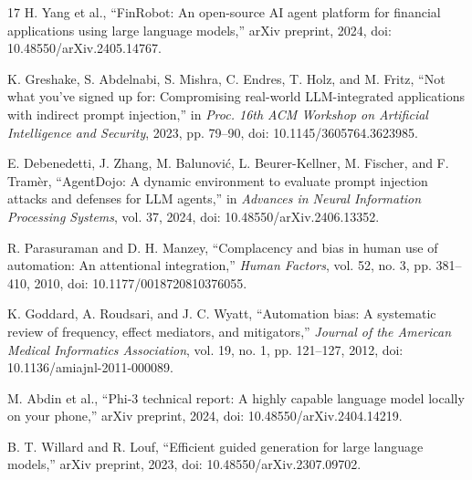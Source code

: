 \begin{thebibliography}{17}
 H. Yang et al., ``FinRobot: An open-source AI agent platform for financial applications using large language models,'' arXiv preprint, 2024, doi: 10.48550/arXiv.2405.14767.

 K. Greshake, S. Abdelnabi, S. Mishra, C. Endres, T. Holz, and M. Fritz, ``Not what you've signed up for: Compromising real-world LLM-integrated applications with indirect prompt injection,'' in \emph{Proc. 16th ACM Workshop on Artificial Intelligence and Security}, 2023, pp. 79--90, doi: 10.1145/3605764.3623985.

 E. Debenedetti, J. Zhang, M. Balunovi\'{c}, L. Beurer-Kellner, M. Fischer, and F. Tram\`{e}r, ``AgentDojo: A dynamic environment to evaluate prompt injection attacks and defenses for LLM agents,'' in \emph{Advances in Neural Information Processing Systems}, vol. 37, 2024, doi: 10.48550/arXiv.2406.13352.

 R. Parasuraman and D. H. Manzey, ``Complacency and bias in human use of automation: An attentional integration,'' \emph{Human Factors}, vol. 52, no. 3, pp. 381--410, 2010, doi: 10.1177/0018720810376055.

 K. Goddard, A. Roudsari, and J. C. Wyatt, ``Automation bias: A systematic review of frequency, effect mediators, and mitigators,'' \emph{Journal of the American Medical Informatics Association}, vol. 19, no. 1, pp. 121--127, 2012, doi: 10.1136/amiajnl-2011-000089.

 M. Abdin et al., ``Phi-3 technical report: A highly capable language model locally on your phone,'' arXiv preprint, 2024, doi: 10.48550/arXiv.2404.14219.

 B. T. Willard and R. Louf, ``Efficient guided generation for large language models,'' arXiv preprint, 2023, doi: 10.48550/arXiv.2307.09702.

\end{thebibliography}
